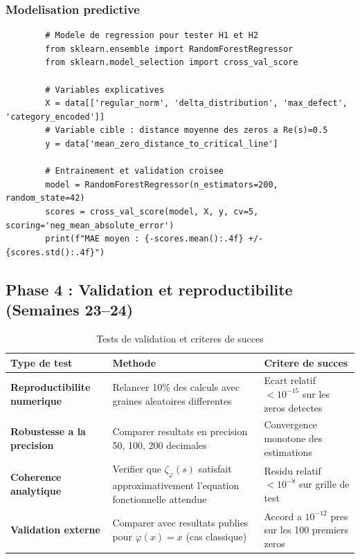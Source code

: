 \documentclass[11pt,a4paper]{article}
\begin{document}
	\subsubsection{Modelisation predictive}
	\begin{verbatim}
		# Modele de regression pour tester H1 et H2
		from sklearn.ensemble import RandomForestRegressor
		from sklearn.model_selection import cross_val_score
		
		# Variables explicatives
		X = data[['regular_norm', 'delta_distribution', 'max_defect', 'category_encoded']]
		# Variable cible : distance moyenne des zeros a Re(s)=0.5
		y = data['mean_zero_distance_to_critical_line']
		
		# Entrainement et validation croisee
		model = RandomForestRegressor(n_estimators=200, random_state=42)
		scores = cross_val_score(model, X, y, cv=5, scoring='neg_mean_absolute_error')
		print(f"MAE moyen : {-scores.mean():.4f} +/- {scores.std():.4f}")
	\end{verbatim}
	
	\subsection{Phase 4 : Validation et reproductibilite (Semaines 23--24)}
	\begin{table}[ht]
		\centering
		\caption{Tests de validation et criteres de succes}
		\label{tab:validation}
		\begin{tabular}{p{4cm}p{5cm}p{5cm}}
			\toprule
			\textbf{Type de test} & \textbf{Methode} & \textbf{Critere de succes} \\
			\midrule
			\textbf{Reproductibilite numerique} & Relancer 10\% des calculs avec graines aleatoires differentes & Ecart relatif $< 10^{-15}$ sur les zeros detectes \\
			\textbf{Robustesse a la precision} & Comparer resultats en precision 50, 100, 200 decimales & Convergence monotone des estimations \\
			\textbf{Coherence analytique} & Verifier que $\zeta_\varphi(s)$ satisfait approximativement l'equation fonctionnelle attendue & Residu relatif $< 10^{-8}$ sur grille de test \\
			\textbf{Validation externe} & Comparer avec resultats publies pour $\varphi(x)=x$ (cas classique) & Accord a $10^{-12}$ pres sur les 100 premiers zeros \\
			\bottomrule
		\end{tabular}
	\end{table}
	
\end{document}
